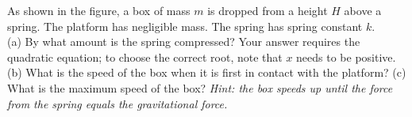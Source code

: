 As shown in the figure, a box of mass $m$ is dropped from a height $H$ above a spring.
The platform has negligible mass. The spring has spring constant $k$.\\
%
(a) By what amount is the spring compressed? Your answer
requires the quadratic equation; to choose the correct root, note
that $x$ needs to be positive.\answercheck\hwendpart
%
(b) What is the speed of the box when it is first in contact with the
platform?\answercheck\hwendpart
%
(c) What is the maximum speed of the box? \emph{Hint: the box speeds
up until the force from the spring equals the gravitational force.}\answercheck
